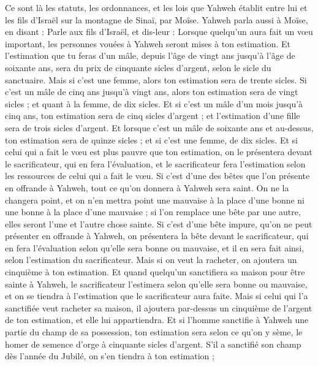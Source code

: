 \begin{multicols}{2}
Ce sont là les statuts, les ordonnances, et les lois que Yahweh établit entre lui et les fils d'Israël sur la montagne de Sinaï, par Moïse.
\VerseOne{}Yahweh parla aussi à Moïse, en disant :
Parle aux fils d'Israël, et dis-leur : Lorsque quelqu'un aura fait un vœu important, les personnes vouées à Yahweh  seront mises à ton estimation.
Et l'estimation que tu feras d'un mâle, depuis l'âge de vingt ans jusqu'à l'âge de soixante ans, sera du prix de cinquante sicles d'argent, selon le sicle du sanctuaire.
Mais si c'est une femme, alors ton estimation sera de trente sicles.
Si c'est un mâle de cinq ans jusqu'à vingt ans, alors ton estimation sera de vingt sicles ; et quant à la femme, de dix sicles.
Et si c'est un mâle d'un mois jusqu'à cinq ans, ton estimation sera de cinq sicles d'argent ; et l'estimation d'une fille sera de trois sicles d'argent.
Et lorsque c'est un mâle de soixante ans et au-dessus, ton estimation sera de quinze sicles ; et si c'est une femme, de dix sicles.
Et si celui qui a fait le vœu est plus pauvre que ton estimation, on le présentera devant le sacrificateur, qui en fera l’évaluation, et le sacrificateur fera l'estimation selon les ressources de celui qui a fait le vœu.
Si c'est d'une des bêtes que l’on présente en offrande à Yahweh, tout ce qu’on donnera à Yahweh sera saint.
On ne la changera point, et on n’en mettra point une mauvaise à la place d’une bonne ni une bonne à la place d’une mauvaise ; si l’on remplace une bête par une autre, elles seront l’une et l’autre chose sainte.
Si c'est d'une bête impure, qu’on ne peut présenter en offrande à Yahweh, on présentera la bête devant le sacrificateur,
qui en fera l’évaluation selon qu'elle sera bonne ou mauvaise, et il en sera fait ainsi, selon l’estimation du sacrificateur.
Mais si on veut la racheter, on ajoutera un cinquième à ton estimation.
Et quand quelqu'un sanctifiera sa maison pour être sainte à Yahweh, le sacrificateur l'estimera selon qu'elle sera bonne ou mauvaise, et on se tiendra à l'estimation que le sacrificateur aura faite.
Mais si celui qui l'a sanctifiée veut racheter sa maison, il ajoutera par-dessus un cinquième de l'argent de ton estimation, et elle lui appartiendra.
Et si l'homme sanctifie à Yahweh une partie du champ de sa possession, ton estimation sera selon ce qu'on y sème, le homer de semence d'orge à cinquante sicles d'argent.
S'il a sanctifié son champ dès l'année du Jubilé, on s’en tiendra à ton estimation ;

\end{multicols}
